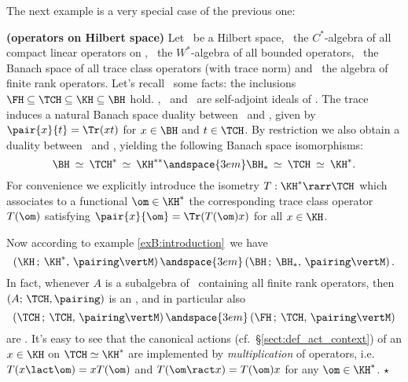 
The next example is a very special case of the previous one:

\begin{exB} \label{ex:operators_on_Hs} \rm
  {\bf (operators on Hilbert space)} \hspace{0.6em}
  Let \Hs\ be a Hilbert space, \KH\ the $C^*$-algebra of all compact
  linear operators on \Hs, \BH\ the $W^*$-algebra of all bounded operators,
  \TCH\ the Banach space of all trace class operators (with trace norm) and
  \FH\ the algebra of finite rank operators.
  Let's recall \cite{Sakai,Takesaki}\ some facts: the inclusions
  $\FH \subseteq \TCH \subseteq \KH \subseteq \BH$ hold.
  \KH, \TCH\ and \FH\ are self-adjoint ideals of \BH\@.
  The trace induces a natural Banach space duality between \BH\ and \TCH, given by
  $ \pair{x}{t} = \Tr(xt)$ for $x\in \BH$ and $t \in \TCH$\@.
  By restriction we also obtain a duality between \KH\ and \TCH,
  yielding the following Banach space isomorphisms:
  $$  \BH\: \simeq \:\TCH^* \,\simeq \:\KH^{**}
               \andspace{3em}
      \BH_*\, \simeq \:\TCH\: \simeq\: \KH^*.  $$
  For convenience we explicitly introduce the isometry $T: \KH^* \rarr \TCH$
  which associates to a functional $\om \in \KH^*$ the corresponding trace class
  operator $T(\om)$ satisfying $\pair{x}{\om} = \Tr(T(\om)x)$ for all $x \in \KH$\@.

  Now according to example \ref{exB:introduction}\ we have \contexts\
  $$ \left( \KH \,;\: \KH^*, \,\pairing \vertM \right)
              \andspace{3em}
     \left( \BH \,;\: \BH_*, \,\pairing \vertM \right).    $$
  In fact, whenever $A$ is a subalgebra of \BH\ containing all finite rank operators,
  then $(A;\, \TCH, \pairing)$ is an \context, and in particular also
  $$ \left( \TCH  \,;\: \TCH, \,\pairing \vertM \right)
              \andspace{3em}
     \left( \FH  \,;\: \TCH, \,\pairing  \vertM \right) $$
  are \contexts\@.
  It's easy to see that the canonical actions  (cf.\ \S\ref{sect:def_act_context})
  of an $x\in \KH$ on $\TCH \simeq \KH^*$ are implemented by {\em multiplication\/}
  of operators, i.e. $T(x \lact \om) = x T(\om)$ and
  $T(\om \ract x) = T(\om)x$ for any $\om \in \KH^*$.
  \hfill $\star$
\end{exB}
